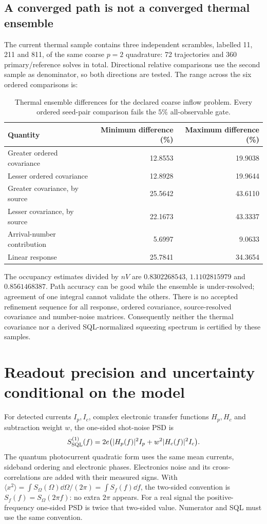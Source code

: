 \subsection{A converged path is not a converged thermal ensemble}
The current thermal sample contains three independent scrambles, labelled
11, 211 and 811, of the same coarse $p=2$ quadrature: 72 trajectories and 360
primary/reference solves in total. Directional relative comparisons use the
second sample as denominator, so both directions are tested. The range across
the six ordered comparisons is:
\begin{table}[ht]
\centering\small
\caption{Thermal ensemble differences for the declared coarse inflow problem.
Every ordered seed-pair comparison fails the $5\%$ all-observable gate.}
\label{tab:gc-thermal-convergence}
\begin{tabular}{lrr}
\toprule
Quantity&Minimum difference (\%)&Maximum difference (\%)\\
\midrule
Greater ordered covariance&12.8553&19.9038\\
Lesser ordered covariance&12.8928&19.9644\\
Greater covariance, by source&25.5642&43.6110\\
Lesser covariance, by source&22.1673&43.3337\\
Arrival-number contribution&5.6997&9.0633\\
Linear response&25.7841&34.3654\\
\bottomrule
\end{tabular}
\end{table}
The occupancy estimates divided by $nV$ are $0.8302268543$, $1.1102815979$
and $0.8561468387$. Path accuracy can be good while the ensemble is
under-resolved; agreement of one integral cannot validate the others. There
is no accepted refinement sequence for all response, ordered covariance,
source-resolved covariance and number-noise matrices. Consequently neither
the thermal covariance nor a derived SQL-normalized squeezing spectrum is
certified by these samples.

\section{Readout precision and uncertainty conditional on the model}
\label{sec:gc-readout}

For detected currents $I_p,I_c$, complex electronic transfer functions $H_p,H_c$
and subtraction weight $w$, the one-sided shot-noise PSD is
\begin{equation}
 S_{\rm SQL}^{(1)}(f)=2e\bigl(|H_p(f)|^2I_p+w^2|H_c(f)|^2I_c\bigr).
 \label{eq:gc-sql}
\end{equation}
The quantum photocurrent quadratic form uses the same mean currents,
sideband ordering and electronic phases. Electronics noise and its
cross-correlations are added with their measured signs. With
$\langle x^2\rangle=\int S_\Omega(\Omega)\dd\Omega/(2\pi)
=\int S_f(f)\dd f$, the two-sided convention is
$S_f(f)=S_\Omega(2\pi f)$: no extra $2\pi$ appears. For a real signal the
positive-frequency one-sided PSD is twice that two-sided value. Numerator
and SQL must use the same convention.

